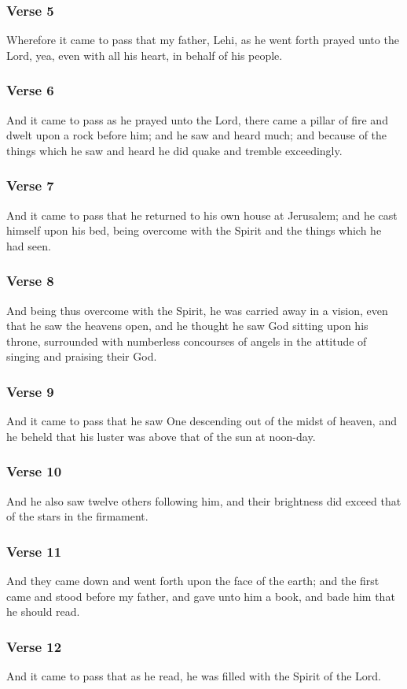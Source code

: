 		\subsubsection{Verse 5}  Wherefore it came to pass that my father, Lehi, as he went forth prayed unto the Lord, yea, even with all his heart, in behalf of his people.
		\subsubsection{Verse 6}  And it came to pass as he prayed unto the Lord, there came a pillar of fire and dwelt upon a rock before him; and he saw and heard much; and because of the things which he saw and heard he did quake and tremble exceedingly.
		\subsubsection{Verse 7}  And it came to pass that he returned to his own house at Jerusalem; and he cast himself upon his bed, being overcome with the Spirit and the things which he had seen.
		\subsubsection{Verse 8}  And being thus overcome with the Spirit, he was carried away in a vision, even that he saw the heavens open, and he thought he saw God sitting upon his throne, surrounded with numberless concourses of angels in the attitude of singing and praising their God.
		\subsubsection{Verse 9}  And it came to pass that he saw One descending out of the midst of heaven, and he beheld that his luster was above that of the sun at noon-day.
		\subsubsection{Verse 10}  And he also saw twelve others following him, and their brightness did exceed that of the stars in the firmament.
		\subsubsection{Verse 11}  And they came down and went forth upon the face of the earth; and the first came and stood before my father, and gave unto him a book, and bade him that he should read.
		\subsubsection{Verse 12}  And it came to pass that as he read, he was filled with the Spirit of the Lord.
